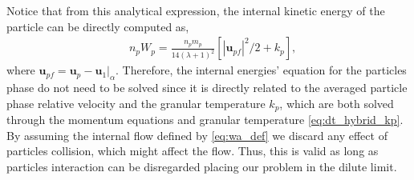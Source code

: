 Notice that from this analytical expression, the internal kinetic energy of the particle can be directly computed as, 
\begin{align*}
    &n_p W_p 
    =\frac{n_pm_p}{14 \left(\lambda +1\right)^2} 
    \left[
        |\textbf{u}_{p f}|^2/2+k_p
    \right],
\end{align*}
where $\textbf{u}_{pf} = \textbf{u}_p - \textbf{u}_1|_\alpha$. 
Therefore, the internal energies' equation for the particles phase do not need to be solved since it is directly related to the averaged particle phase relative velocity and the granular temperature $k_p$, which are both solved through the momentum equations and granular temperature \ref{eq:dt_hybrid_kp}.
By assuming the internal flow defined by \ref{eq:wa_def} we discard any effect of particles collision, which might affect the flow. 
Thus, this is valid as long as particles interaction can be disregarded placing our problem in the dilute limit. 

